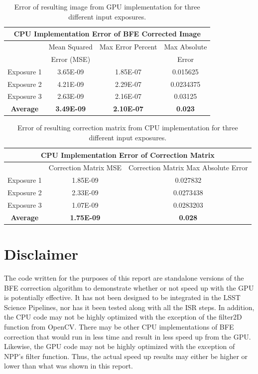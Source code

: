 \documentclass[DM,authoryear,toc]{lsstdoc}
\begin{document}
\begin{table}[h]
\begin{center}
\begin{tabular}{|c|c|c|c|}
\multicolumn{4}{c}{\textbf{CPU Implementation Error of BFE Corrected Image}}\\
\hline
 & Mean Squared & Max Error Percent & Max Absolute\\
 & Error (MSE) & & Error\\
\hline
Exposure 1 & 3.65E-09 & 1.85E-07 & 0.015625\\
\hline
Exposure 2 & 4.21E-09 & 2.29E-07 & 0.0234375\\
\hline
Exposure 3 & 2.63E-09 & 2.16E-07 & 0.03125\\
\hline
\textbf{Average} & \textbf{3.49E-09} & \textbf{2.10E-07} & \textbf{0.023}\\
\hline
\end{tabular}
\caption{\label{tab:cpuerrcorrimg}Error of resulting image from GPU implementation for three different input exposures.
}
\end{center}
\end{table}

\begin{table}[h]
\begin{center}
\begin{tabular}{|c|c|c|}
\multicolumn{3}{c}{\textbf{CPU Implementation Error of Correction Matrix}}\\
\hline
 & Correction Matrix MSE & Correction Matrix Max Absolute Error\\
\hline
Exposure 1 & 1.85E-09 & 0.027832\\
\hline
Exposure 2 & 2.33E-09 & 0.0273438\\
\hline
Exposure 3 & 1.07E-09 & 0.0283203\\
\hline
\textbf{Average} & \textbf{1.75E-09} & \textbf{0.028}\\
\hline
\end{tabular}
\caption{\label{tab:cpuerrcorrmat}Error of resulting correction matrix from CPU implementation for three different input exposures.}
\end{center}
\end{table}


\section{Disclaimer}
The code written for the purposes of this report are standalone versions of the BFE correction algorithm to demonstrate whether or not speed up with the GPU is potentially effective. It has not been designed to be integrated in the LSST Science Pipelines, nor has it been tested along with all the ISR steps. In addition, the CPU code may not be highly optimized with the exception of the filter2D function from OpenCV. There may be other CPU implementations of BFE correction that would run in less time and result in less speed up from the GPU. Likewise, the GPU code may not be highly optimized with the exception of NPP's filter function. Thus, the actual speed up results may either be higher or lower than what was shown in this report.
\end{document}
